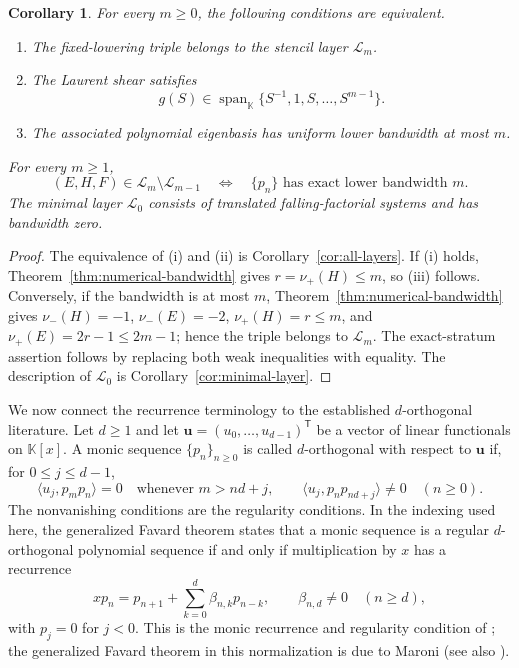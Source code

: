 \documentclass[11pt,reqno]{amsart}
\numberwithin{equation}{section}
\newtheorem{corollary}[theorem]{Corollary}
\theoremstyle{definition}
\theoremstyle{remark}
\newcommand{\K}{\mathbb K}
\newcommand{\calL}{\mathcal L}
\newcommand{\Span}{\operatorname{span}}
\begin{document}
\begin{corollary}\label{thm:filtration}
For every $m\ge0$, the following conditions are equivalent.
\begin{enumerate}[label=\textup{(\roman*)},leftmargin=2.3em]
\item The fixed-lowering triple belongs to the stencil layer $\calL_m$.
\item The Laurent shear satisfies
\[
 g(S)\in\Span_{\K}\{S^{-1},1,S,\ldots,S^{m-1}\}.
\]
\item The associated polynomial eigenbasis has uniform lower bandwidth at most $m$.
\end{enumerate}
For every $m\ge1$,
\begin{equation}\label{eq:exact-strata}
 (E,H,F)\in\calL_m\setminus\calL_{m-1}
 \quad\Longleftrightarrow\quad
 \text{$\{p_n\}$ has exact lower bandwidth $m$}.
\end{equation}
The minimal layer $\calL_0$ consists of translated falling-factorial systems and has bandwidth zero.
\end{corollary}

\begin{proof}
The equivalence of (i) and (ii) is Corollary~\ref{cor:all-layers}.  If (i) holds, Theorem~\ref{thm:numerical-bandwidth} gives $r=\nu_+(H)\le m$, so (iii) follows.  Conversely, if the bandwidth is at most $m$, Theorem~\ref{thm:numerical-bandwidth} gives $\nu_-(H)=-1$, $\nu_-(E)=-2$, $\nu_+(H)=r\le m$, and $\nu_+(E)=2r-1\le2m-1$; hence the triple belongs to $\calL_m$.  The exact-stratum assertion follows by replacing both weak inequalities with equality.  The description of $\calL_0$ is Corollary~\ref{cor:minimal-layer}.
\end{proof}

We now connect the recurrence terminology to the established $d$-orthogonal literature.  Let $d\ge1$ and let $\mathbf u=(u_0,\ldots,u_{d-1})^{\mathsf T}$ be a vector of linear functionals on $\K[x]$.  A monic sequence $\{p_n\}_{n\ge0}$ is called $d$-orthogonal with respect to $\mathbf u$ if, for $0\le j\le d-1$,
\begin{equation}\label{eq:d-orthogonality-definition}
 \langle u_j,p_m p_n\rangle=0\quad\text{whenever }m>nd+j,
 \qquad
 \langle u_j,p_n p_{nd+j}\rangle\ne0
 \quad(n\ge0).
\end{equation}
The nonvanishing conditions are the regularity conditions.  In the indexing used here, the generalized Favard theorem states that a monic sequence is a regular $d$-orthogonal polynomial sequence if and only if multiplication by $x$ has a recurrence
\begin{equation}\label{eq:d-favard}
 xp_n=p_{n+1}+\sum_{k=0}^{d}\beta_{n,k}p_{n-k},
 \qquad
 \beta_{n,d}\ne0\quad(n\ge d),
\end{equation}
with $p_j=0$ for $j<0$.  This is the monic recurrence and regularity condition of \cite[Definition~1.1 and (1.2)]{BenCheikhZaghouani2003}; the generalized Favard theorem in this normalization is due to Maroni \cite{Maroni1989} (see also \cite{Maroni1981,VanIseghem1987}).
\end{document}

